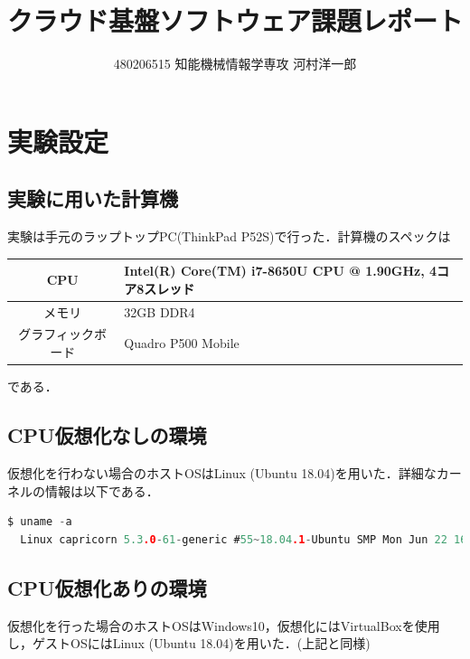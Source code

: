 \documentclass[onecolumn]{preport}
\title{クラウド基盤ソフトウェア課題レポート}
\author{480206515 知能機械情報学専攻 河村洋一郎}
\begin{document}
\pagestyle{empty}
\maketitle
\thispagestyle{empty}
\sloppy

\section{実験設定}
\subsection{実験に用いた計算機}
実験は手元のラップトップPC(ThinkPad P52S)で行った．計算機のスペックは
\begin{table}[htb]
  \begin{tabular}{c|l} \hline
    CPU & Intel(R) Core(TM) i7-8650U CPU @ 1.90GHz, 4コア8スレッド \\ \hline
    メモリ & 32GB DDR4 \\ \hline
    グラフィックボード &  Quadro P500 Mobile \\ \hline
  \end{tabular}
\end{table}
である．
\subsection{CPU仮想化なしの環境}
仮想化を行わない場合のホストOSはLinux (Ubuntu 18.04)を用いた．詳細なカーネルの情報は以下である．


\begin{lstlisting}[language=c]
  $ uname -a
  Linux capricorn 5.3.0-61-generic #55~18.04.1-Ubuntu SMP Mon Jun 22 16:40:20 UTC 2020 x86_64 x86_64 x86_64 GNU/Linux
\end{lstlisting}

\subsection{CPU仮想化ありの環境}
仮想化を行った場合のホストOSはWindows10，仮想化にはVirtualBoxを使用し，ゲストOSにはLinux (Ubuntu 18.04)を用いた．(上記と同様)
\end{document}
